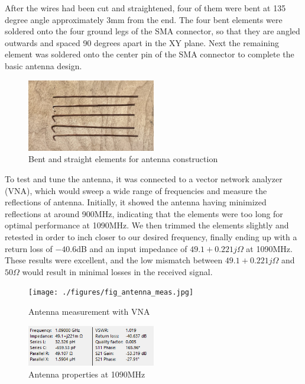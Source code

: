 \documentclass[conference, onecolumn]{IEEEtran}
\begin{document}
After the wires had been cut and straightened, four of them were bent at 135 degree angle approximately 3mm from the end. The four bent elements were soldered onto the four ground legs of the SMA connector, so that they are angled outwards and spaced 90 degrees apart in the XY plane. Next the remaining element was soldered onto the center pin of the SMA connector to complete the basic antenna design. 

\begin{figure}
  \begin{center}
    \includegraphics[width=0.5\textwidth]{./figures/fig_antenna elements-2.jpg}
  \end{center}
  \caption{Bent and straight elements for antenna construction}\label{fig:ant_el_bt}
\end{figure}

To test and tune the antenna, it was connected to a vector network analyzer (VNA), which would sweep a wide range of frequencies and measure the reflections of antenna. Initially, it showed the antenna having minimized reflections at around 900MHz, indicating that the elements were too long for optimal performance at 1090MHz. We then trimmed the elements slightly and retested in order to inch closer to our desired frequency, finally ending up with a return loss of $-40.6$dB and an input impedance of $49.1+0.221j\Omega$ at 1090MHz. These results were excellent, and the low mismatch between $49.1+0.221j\Omega$ and $50\Omega$ would result in minimal losses in the received signal.

\begin{figure}
  \begin{center}
    \texttt{[image: ./figures/fig\_antenna\_meas.jpg]}
  \end{center}
  \caption{Antenna measurement with VNA}\label{fig:ant_meas}
\end{figure}

\begin{figure}
  \begin{center}
    \includegraphics[width=0.5\textwidth]{./figures/fig_antenna_data.png}
  \end{center}
  \caption{Antenna properties at 1090MHz}\label{fig:ant_data}
\end{figure}
\end{document}
